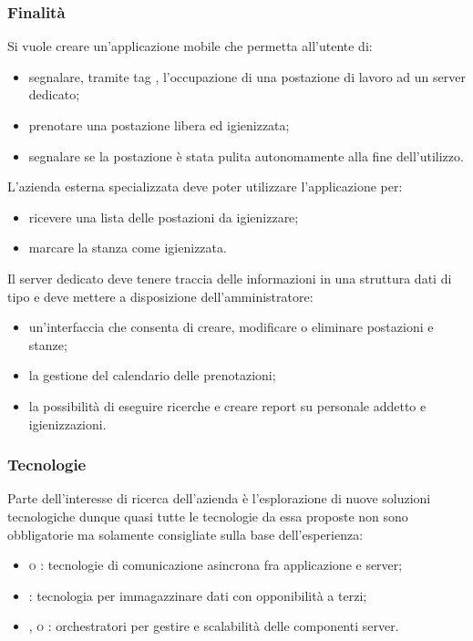 \documentclass[]{article}
\begin{document}
			\subsubsection{Finalità}
			Si vuole creare un'applicazione mobile che permetta all'utente di:
			\begin{itemize}
				\item segnalare, tramite tag , l'occupazione di una postazione di lavoro ad un server dedicato;
				\item prenotare una postazione libera ed igienizzata;
				\item segnalare se la postazione è stata pulita autonomamente alla fine dell'utilizzo.
			\end{itemize}
			L'azienda esterna specializzata deve poter utilizzare l'applicazione per:
			\begin{itemize}
				\item ricevere una lista delle postazioni da igienizzare;
				\item marcare la stanza come igienizzata.
			\end{itemize}
			Il server dedicato deve tenere traccia delle informazioni in una struttura dati di tipo  e deve mettere a disposizione dell'amministratore:
			\begin{itemize}
				\item un'interfaccia che consenta di creare, modificare o eliminare postazioni e stanze;
				\item la gestione del calendario delle prenotazioni;
				\item la possibilità di eseguire ricerche e creare report su personale addetto e igienizzazioni.
			\end{itemize}

			\subsubsection{Tecnologie}
			Parte dell'interesse di ricerca dell'azienda è l'esplorazione di nuove soluzioni tecnologiche dunque quasi tutte le tecnologie da essa proposte non sono obbligatorie ma solamente consigliate sulla base dell'esperienza:
			\begin{itemize}
				\item \textsc{ o :} tecnologie di comunicazione asincrona fra applicazione e server;
				\item \textsc{:} tecnologia  per immagazzinare dati con opponibilità a terzi;
				\item \textsc{,  o :} orchestratori per gestire  e scalabilità delle componenti server.
			\end{itemize}
\end{document}
